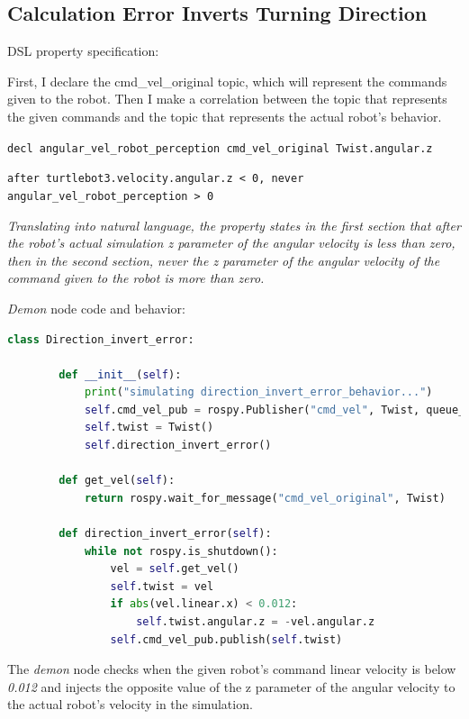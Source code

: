 \subsection{Calculation Error Inverts Turning Direction}
\label{ssec:calculationerrorinvertsturningdirection}

DSL property specification:

First, I declare the cmd\_vel\_original topic, which will represent the commands given to the robot.
Then I make a correlation between the topic that represents the given commands and the topic that represents the actual robot's behavior.

\texttt{decl angular\_vel\_robot\_perception cmd\_vel\_original Twist.angular.z}

\texttt{after turtlebot3.velocity.angular.z < 0, never angular\_vel\_robot\_perception > 0}

\textit{Translating into natural language, the property states in the first section that after the robot's actual simulation z parameter of the angular velocity is less than zero, then in the second section, never the z parameter of the angular velocity of the command given to the robot is more than zero.}

\textit{Demon} node code and behavior:

\begin{lstlisting}[language=python]
    class Direction_invert_error:

        def __init__(self):
            print("simulating direction_invert_error_behavior...")
            self.cmd_vel_pub = rospy.Publisher("cmd_vel", Twist, queue_size=1)
            self.twist = Twist()
            self.direction_invert_error()

        def get_vel(self):
            return rospy.wait_for_message("cmd_vel_original", Twist)

        def direction_invert_error(self):
            while not rospy.is_shutdown():
                vel = self.get_vel()
                self.twist = vel
                if abs(vel.linear.x) < 0.012:
                    self.twist.angular.z = -vel.angular.z
                self.cmd_vel_pub.publish(self.twist)
\end{lstlisting}

The \textit{demon} node checks when the given robot's command linear velocity is below \textit{0.012} and injects the opposite value of the z parameter of the angular velocity to the actual robot's velocity in the simulation.

